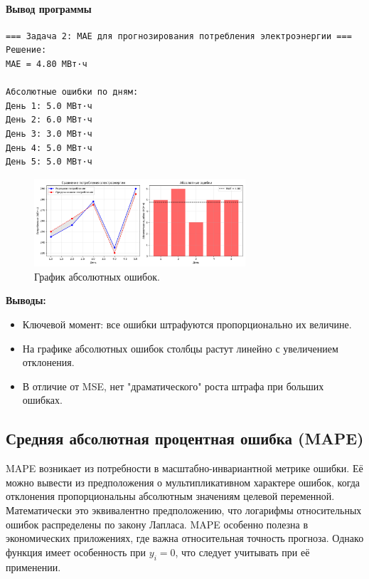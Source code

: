 \paragraph{Вывод программы}
\begin{verbatim}
=== Задача 2: MAE для прогнозирования потребления электроэнергии ===
Решение:
MAE = 4.80 МВт·ч

Абсолютные ошибки по дням:
День 1: 5.0 МВт·ч
День 2: 6.0 МВт·ч
День 3: 3.0 МВт·ч
День 4: 5.0 МВт·ч
День 5: 5.0 МВт·ч
\end{verbatim}

\begin{figure}[h!]
    \centering
    \includegraphics[width=0.7\textwidth]{chapters/general/imgs/mae.png}
    \caption{График абсолютных ошибок.}
    \label{fig:mae_graph}
\end{figure}

\noindent\textbf{Выводы:}
\begin{itemize}
    \item Ключевой момент: все ошибки штрафуются пропорционально их величине.
    \item На графике абсолютных ошибок столбцы растут линейно с увеличением отклонения.
    \item В отличие от MSE, нет "драматического" роста штрафа при больших ошибках.
\end{itemize}




\subsection{Средняя абсолютная процентная ошибка (MAPE)}

MAPE возникает из потребности в масштабно-инвариантной метрике ошибки. Её можно вывести из предположения о мультипликативном характере ошибок, когда отклонения пропорциональны абсолютным значениям целевой переменной. Математически это эквивалентно предположению, что логарифмы относительных ошибок распределены по закону Лапласа. MAPE особенно полезна в экономических приложениях, где важна относительная точность прогноза. Однако функция имеет особенность при $y_i = 0$, что следует учитывать при её применении.

